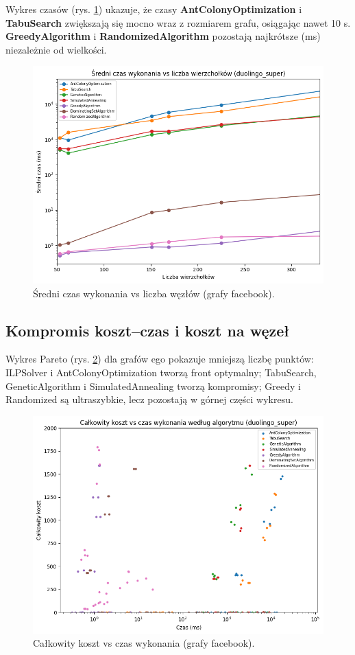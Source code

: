 Wykres czasów (rys. \ref{fig:facebook_time_vs_nodes}) ukazuje, że czasy \textbf{AntColonyOptimization} i \textbf{TabuSearch} zwiększają się mocno wraz z rozmiarem grafu, osiągając nawet 10 s. \textbf{GreedyAlgorithm} i \textbf{RandomizedAlgorithm} pozostają najkrótsze (ms) niezależnie od wielkości.

\begin{figure}[H]
  \centering
  \includegraphics[width=0.7\linewidth]{assets/figures/facebook_time_vs_nodes.png}
  \caption{Średni czas wykonania vs liczba węzłów (grafy facebook).}
  \label{fig:facebook_time_vs_nodes}
\end{figure}

\subsection{Kompromis koszt--czas i koszt na węzeł}

Wykres Pareto (rys. \ref{fig:facebook_pareto}) dla grafów ego pokazuje mniejszą liczbę punktów: ILPSolver i AntColonyOptimization tworzą front optymalny; TabuSearch, GeneticAlgorithm i SimulatedAnnealing tworzą kompromisy; Greedy i Randomized są ultraszybkie, lecz pozostają w górnej części wykresu.

\begin{figure}[H]
  \centering
  \includegraphics[width=0.7\linewidth]{assets/figures/facebook_pareto.png}
  \caption{Całkowity koszt vs czas wykonania (grafy facebook).}
  \label{fig:facebook_pareto}
\end{figure}

